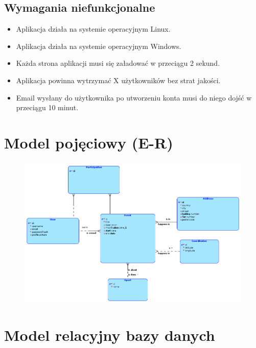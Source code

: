 \documentclass[11pt,a4paper]{article}
\begin{document}
\subsection{Wymagania niefunkcjonalne}

\begin{itemize}
    \item Aplikacja działa na systemie operacyjnym Linux.
    \item Aplikacja działa na systemie operacyjnym Windows.
    \item Każda strona aplikacji musi się załadować w przeciągu 2 sekund.
    \item Aplikacja powinna wytrzymać X użytkowników bez strat jakości.
    \item Email wysłany do użytkownika po utworzeniu konta musi do niego dojść w przeciągu 10 minut.
\end{itemize}

\section{Model pojęciowy (E-R)}

\begin{figure} [H]
    \centering
    \includegraphics[width=0.95\linewidth]{../model/model_er.png}
\end{figure}

\section{Model relacyjny bazy danych}
\end{document}
